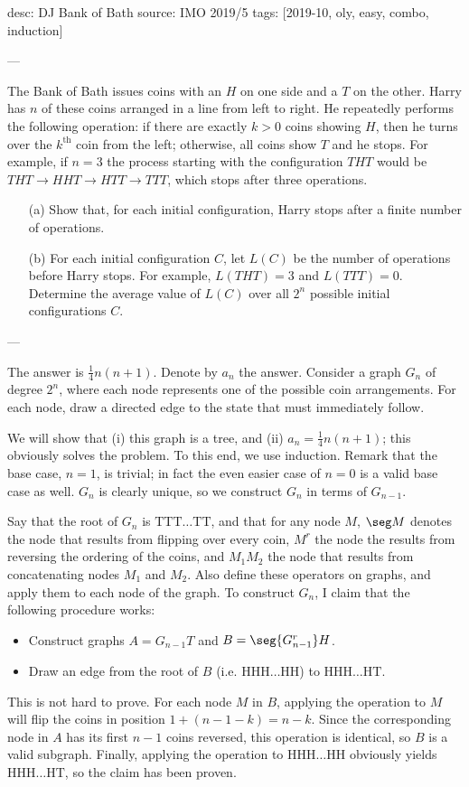 desc: DJ Bank of Bath
source: IMO 2019/5
tags: [2019-10, oly, easy, combo, induction]

---

The Bank of Bath issues coins with an $H$ on one side and a $T$ on the other. Harry has $n$ of these coins arranged in a line from left to right. He repeatedly performs the following operation: if there are exactly $k>0$ coins showing $H$, then he turns over the $k^\text{th}$ coin from the left; otherwise, all coins show $T$ and he stops. For example, if $n=3$ the process starting with the configuration $THT$ would be $THT\to HHT\to HTT\to TTT$, which stops after three operations.
\begin{itemize}
    \item[(a)] Show that, for each initial configuration, Harry stops after a finite number of operations.
        \vspace{-0.5em}
    \item[(b)] For each initial configuration $C$, let $L(C)$ be the number of operations before Harry stops. For example, $L(THT)=3$ and $L(TTT)=0$. Determine the average value of $L(C)$ over all $2^n$ possible initial configurations $C$.
\end{itemize}

---

The answer is $\tfrac14n(n+1)$. Denote by $a_n$ the answer. Consider a graph $G_n$ of degree $2^n$, where each node represents one of the possible coin arrangements. For each node, draw a directed edge to the state that must immediately follow.

We will show that (i) this graph is a tree, and (ii) $a_n=\tfrac14n(n+1)$; this obviously solves the problem. To this end, we use induction. Remark that the base case, $n=1$, is trivial; in fact the even easier case of $n=0$ is a valid base case as well. $G_n$ is clearly unique, so we construct $G_n$ in terms of $G_{n-1}$.

Say that the root of $G_n$ is $\text{TTT}\ldots\text{TT}$, and that for any node $M$, $\seg M$ denotes the node that results from flipping over every coin, $M^r$ the node the results from reversing the ordering of the coins, and $M_1M_2$ the node that results from concatenating nodes $M_1$ and $M_2$. Also define these operators on graphs, and apply them to each node of the graph. To construct $G_n$, I claim that the following procedure works:
\begin{itemize}
    \item Construct graphs $A=G_{n-1}T$ and $B=\seg{G_{n-1}^r}H$.
        \vspace{-0.5em}
    \item Draw an edge from the root of $B$ (i.e. $\text{HHH}\ldots\text{HH}$) to $\text{HHH}\ldots\text{HT}$.
\end{itemize}
This is not hard to prove. For each node $M$ in $B$, applying the operation to $M$ will flip the coins in position $1+(n-1-k)=n-k$. Since the corresponding node in $A$ has its first $n-1$ coins reversed, this operation is identical, so $B$ is a valid subgraph. Finally, applying the operation to $\text{HHH}\ldots\text{HH}$ obviously yields $\text{HHH}\ldots\text{HT}$, so the claim has been proven.

